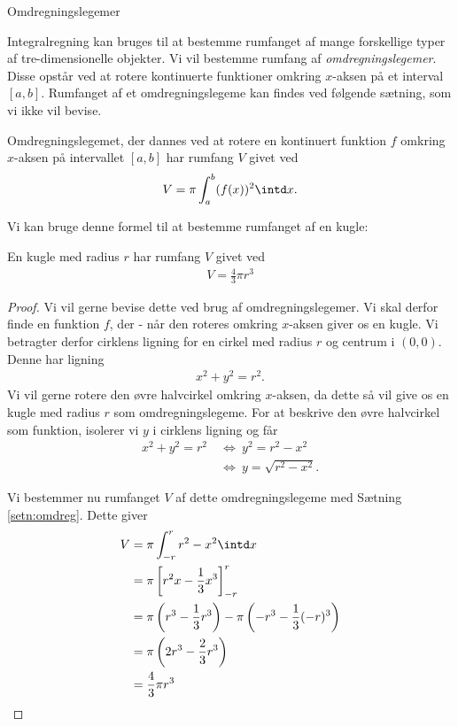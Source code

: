 
\begin{center}
\Huge
Omdregningslegemer
\end{center}
Integralregning kan bruges til at bestemme rumfanget af mange forskellige typer af tre-dimensionelle objekter. Vi vil bestemme rumfang af \textit{omdregningslegemer}. Disse opstår ved at rotere kontinuerte funktioner omkring $x$-aksen på et interval $[a,b]$. Rumfanget af et omdregningslegeme kan findes ved følgende sætning, som vi ikke vil bevise. 
\begin{setn}\label{setn:omdreg}
Omdregningslegemet, der dannes ved at rotere en kontinuert funktion $f$ omkring $x$-aksen på intervallet $[a,b]$ har rumfang $V$ givet ved
\begin{align*}
V = \pi\int_a^b (f(x))^2 \intd x.
\end{align*}
\end{setn}

Vi kan bruge denne formel til at bestemme rumfanget af en kugle:
\begin{setn}
En kugle med radius $r$ har rumfang $V$ givet ved
\begin{align*}
V = \frac{4}{3}\pi r^3
\end{align*}
\end{setn}
\begin{proof}
Vi vil gerne bevise dette ved brug af omdregningslegemer. Vi skal derfor finde en funktion $f$, der - når den roteres omkring $x$-aksen giver os en kugle. Vi betragter derfor cirklens ligning for en cirkel med radius $r$ og centrum i $(0,0)$. Denne har ligning
\begin{align*}
x^2+y^2 = r^2.
\end{align*}
Vi vil gerne rotere den øvre halvcirkel omkring $x$-aksen, da dette så vil give os en kugle med radius $r$ som omdregningslegeme. For at beskrive den øvre halvcirkel som funktion, isolerer vi $y$ i cirklens ligning og får
\begin{align*}
x^2+y^2 = r^2 \ &\Leftrightarrow \ y^2 = r^2-x^2 \\
& \Leftrightarrow \ y = \sqrt{r^2-x^2}.
\end{align*}

Vi bestemmer nu rumfanget $V$ af dette omdregningslegeme med Sætning \ref{setn:omdreg}. Dette giver 
\begin{align*}
V &= \pi\int_{-r}^r r^2-x^2 \intd x\\
&= \pi\left[r^2x-\frac{1}{3}x^3\right]_{-r}^r\\
&= \pi\left(r^3-\frac{1}{3}r^3\right)-\pi\left(-r^3-\frac{1}{3}(-r)^3\right) \\
&= \pi\left(2r^3-\frac{2}{3}r^3\right)\\
&= \frac{4}{3}\pi r^3
\end{align*}

\end{proof}